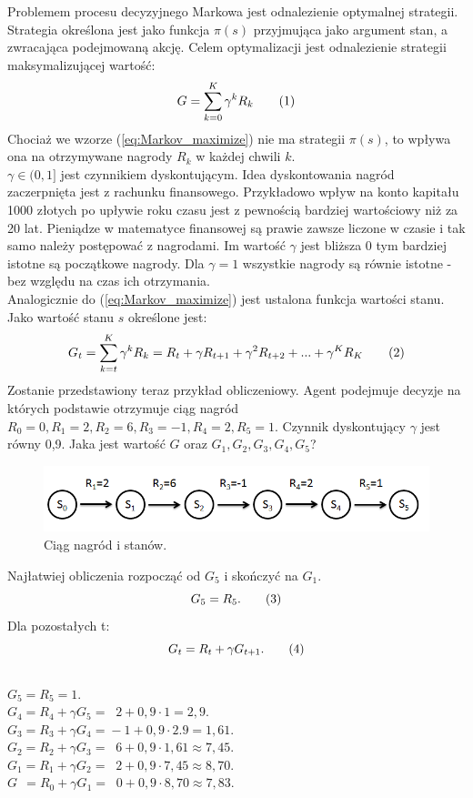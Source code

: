 \documentclass[12pt]{book}
\theoremstyle{plain}
\newcommand\addtag{\refstepcounter{equation}
\renewcommand{\labelenumii}{\theenumii}
\renewcommand{\theenumii}{\theenumi.\arabic{enumii}.}
\tag{\theequation}}
\newcommand{\myref}[1]{(\ref{#1})}
\begin{document}
Problemem procesu decyzyjnego Markowa jest odnalezienie optymalnej strategii. Strategia określona jest jako funkcja $\pi(s)$ przyjmująca jako argument stan, a zwracająca podejmowaną akcję. Celem optymalizacji jest odnalezienie strategii maksymalizującej wartość:
\[
G=\sum_{k=0}^{K} \gamma^k R_{k} \addtag \label{eq:Markov_maximize}
\]
Chociaż we wzorze \myref{eq:Markov_maximize} nie ma strategii $\pi(s)$, to wpływa ona na otrzymywane nagrody $R_{k}$ w każdej chwili $k$.\\
$\gamma \in (0,1]$ jest czynnikiem dyskontującym. Idea dyskontowania nagród zaczerpnięta jest z rachunku finansowego. Przykładowo wpływ na konto kapitału 1000 złotych po upływie roku czasu jest z pewnością bardziej wartościowy niż za 20 lat. Pieniądze w matematyce finansowej są prawie zawsze liczone w czasie i tak samo należy postępować z nagrodami. Im wartość $\gamma$ jest bliższa 0 tym bardziej istotne są początkowe nagrody. Dla $\gamma=1$ wszystkie nagrody są równie istotne - bez względu na czas ich otrzymania.\\
Analogicznie do (\ref{eq:Markov_maximize}) jest ustalona funkcja wartości stanu. Jako wartość stanu $s$ określone jest:
\[
G_t=\sum_{k=t}^{K} \gamma^k R_{k}=R_{t}+\gamma R_{t+1}+\gamma^{2} R_{t+2}+...+\gamma^{K}R_K \addtag \label{eq:Markov_state_value_G}
\]
Zostanie przedstawiony teraz przykład obliczeniowy. Agent podejmuje decyzje na których podstawie otrzymuje ciąg  nagród $R_0=0, R_1=2,R_2=6,R_3=-1,R_4=2,R_5=1$. Czynnik dyskontujący $\gamma$ jest równy 0,9. Jaka jest wartość $G$ oraz $G_1,G_2,G_3,G_4,G_5$?\\
\begin{figure}[H]
	\centering
	\includegraphics[width=14cm]{rewards-graph}
	\caption{Ciąg nagród i stanów.}
	\label{fig:agent-srodowisko}
\end{figure}\noindent
Najłatwiej obliczenia rozpocząć od $G_5$ i skończyć na $G_1$.
\[G_5=R_5.  \addtag\]
Dla pozostałych t:
\[G_{t}=R_{t}+\gamma G_{t+1} \label{eq:G_reccurential}. \addtag \]\\
$G_5=R_5=1.$\\
$G_4=R_4+\gamma G_{5}=\;\;2+0,9\cdot 1=2,9.$\\
$G_3=R_3+\gamma G_{4}=\!-1+0,9\cdot2.9=1,61.$\\
$G_2=R_2+\gamma G_{3}=\;\;6+0,9\cdot1,61 \approx 7,45.$\\
$G_1=R_1+\gamma G_{2}=\;\;2+0,9\cdot 7,45 \approx 8,70.$\\
$G\;\,=R_0+\gamma G_{1}=\;\;0+0,9\cdot 8,70 \approx 7,83.$\\
\end{document}
